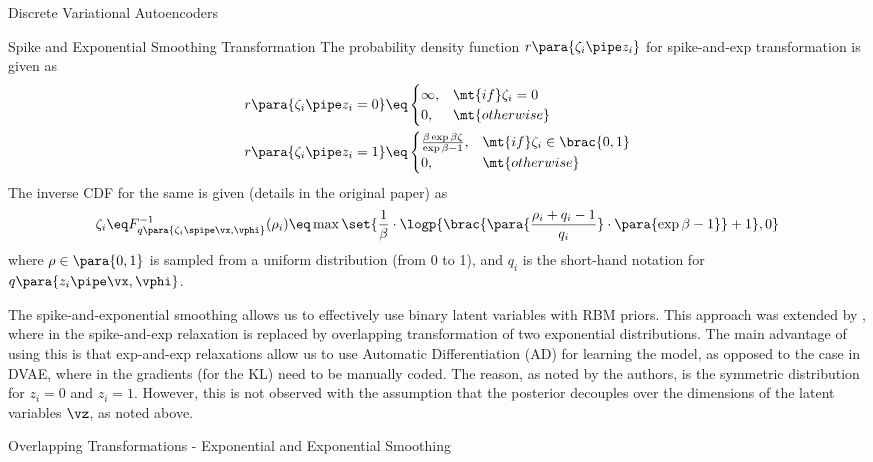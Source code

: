 \documentclass{article}
\newcommand{\qp}{q\para}
\newcommand{\rp}{r\para}
\begin{document}
\begin{psection}{Discrete Variational Autoencoders}
\begin{psubsection}{Spike and Exponential Smoothing Transformation}
		The probability density function $\rp{\zeta_i \pipe z_i}$ for spike-and-exp transformation is given as
		\begin{align}
			\rp{\zeta_i \pipe z_i = 0}	&\eq \begin{cases}
				\infty,	& \mt{if} \zeta_i = 0 \\
				0,		& \mt{otherwise}
			\end{cases} \nonumber \\
			\rp{\zeta_i \pipe z_i = 1}	&\eq \begin{cases}
				\frac{\beta \exp{\beta \zeta}}{\exp{\beta} - 1},	& \mt{if} \zeta_i \in \brac{0, 1} \\
				0,													& \mt{otherwise}
			\end{cases}
			\label{eq:spike-and-exp:pdf}
		\end{align}
		The inverse CDF for the same is given (details in the original paper) as
		\begin{align}
			\zeta_i \eq F_{\qp{\zeta_i \spipe \vx, \vphi}}^{-1}(\rho_i)	\eq \max\set{\frac{1}{\beta} \cdot \logp{\brac{\para{\frac{\rho_i + q_i - 1}{q_i}} \cdot \para{\exp{\beta} - 1}} + 1}, 0}
			\label{eq:spike-and-exp:icdf}
		\end{align}
		where $\rho \in \para{0, 1}$ is sampled from a uniform distribution (from 0 to 1), and $q_i$ is the short-hand notation for $\qp{z_i \pipe \vx, \vphi}$.

	\end{psubsection}

	The spike-and-exponential smoothing allows us to effectively use binary latent variables with RBM priors. This approach was extended by \cite{dvae-pp}, where in the spike-and-exp relaxation is replaced by overlapping transformation of two exponential distributions. The main advantage of using this is that exp-and-exp relaxations allow us to use Automatic Differentiation (AD) for learning the model, as opposed to the case in DVAE, where in the gradients (for the KL) need to be manually coded. The reason, as noted by the authors, is the symmetric distribution for $z_i = 0$ and $z_i = 1$. However, this is not observed with the assumption that the posterior decouples over the dimensions of the latent variables $\vz$, as noted above.

	\begin{psubsection}{Overlapping Transformations - Exponential and Exponential Smoothing}


\end{psubsection}
\end{psection}
\end{document}

